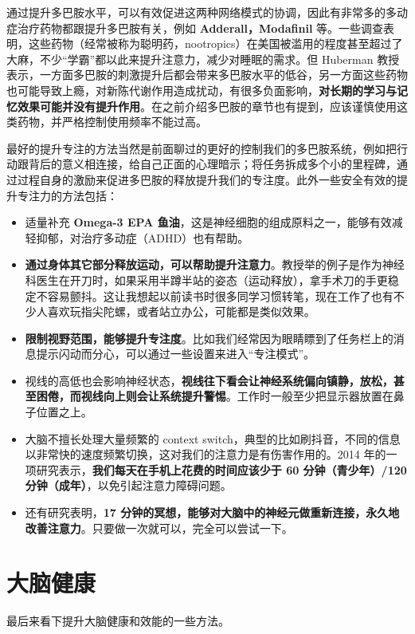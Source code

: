 \documentclass{report}
\begin{document}
通过提升多巴胺水平，可以有效促进这两种网络模式的协调，因此有非常多的多动症治疗药物都跟提升多巴胺有关，例如 \textbf{Adderall，Modafinil} 等。一些调查表明，这些药物（经常被称为聪明药，nootropics）在美国被滥用的程度甚至超过了大麻，不少“学霸”都以此来提升注意力，减少对睡眠的需求。但 Huberman 教授表示，一方面多巴胺的刺激提升后都会带来多巴胺水平的低谷，另一方面这些药物也可能导致上瘾，对新陈代谢作用造成扰动，有很多负面影响，\textbf{对长期的学习与记忆效果可能并没有提升作用}。在之前介绍多巴胺的章节也有提到，应该谨慎使用这类药物，并严格控制使用频率不能过高。

最好的提升专注的方法当然是前面聊过的更好的控制我们的多巴胺系统，例如把行动跟背后的意义相连接，给自己正面的心理暗示；将任务拆成多个小的里程碑，通过过程自身的激励来促进多巴胺的释放提升我们的专注度。此外一些安全有效的提升专注力的方法包括：

\begin{itemize}
    \item 适量补充 \textbf{Omega-3 EPA 鱼油}，这是神经细胞的组成原料之一，能够有效减轻抑郁，对治疗多动症（ADHD）也有帮助。
    \item \textbf{通过身体其它部分释放运动，可以帮助提升注意力}。教授举的例子是作为神经科医生在开刀时，如果采用半蹲半站的姿态（运动释放），拿手术刀的手更稳定不容易颤抖。这让我想起以前读书时很多同学习惯转笔，现在工作了也有不少人喜欢玩指尖陀螺，或者站立办公，可能都是类似效果。
    \item \textbf{限制视野范围，能够提升专注度}。比如我们经常因为眼睛瞟到了任务栏上的消息提示闪动而分心，可以通过一些设置来进入“专注模式”。
    \item 视线的高低也会影响神经状态，\textbf{视线往下看会让神经系统偏向镇静，放松，甚至困倦，而视线向上则会让系统提升警惕}。工作时一般至少把显示器放置在鼻子位置之上。
    \item 大脑不擅长处理大量频繁的 context switch，典型的比如刷抖音，不同的信息以非常快的速度频繁切换，这对我们的注意力是有伤害作用的。2014 年的一项研究表示，\textbf{我们每天在手机上花费的时间应该少于 60 分钟（青少年）/120 分钟（成年）}，以免引起注意力障碍问题。
    \item 还有研究表明，\textbf{17 分钟的冥想，能够对大脑中的神经元做重新连接，永久地改善注意力}。只要做一次就可以，完全可以尝试一下。
\end{itemize}

\section{大脑健康}

最后来看下提升大脑健康和效能的一些方法。
\end{document}
